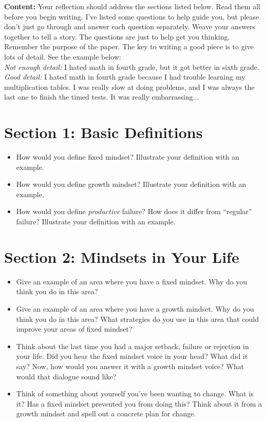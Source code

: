 \documentclass{article}
\begin{document}
\noindent\textbf{Content:} Your reflection should address the sections listed below.  Read them all before you begin writing. I've listed some questions to help guide you, but please don't just go through and answer each question separately.  Weave your answers together to tell a story. The questions are just to help get you thinking.  Remember the purpose of the paper.   The key to writing a good piece is to give lots of detail.  See the example below:\\

\noindent\textit{Not enough detail:} I hated math in fourth grade, but it got better in sixth grade.\\

\noindent\textit{Good detail:} I hated math in fourth grade because I had trouble learning my multiplication tables.  I was really slow at doing problems, and I was always the last one to finish the timed tests.  It was really embarrassing...

\section*{Section 1: Basic Definitions}
\begin{itemize}
\item How would you define fixed mindset? Illustrate your definition with an example.
\item How would you define growth mindset? Illustrate your definition with an example.
\item How would you define \textit{productive} failure? How does it differ from ``regular'' failure? Illustrate your definition with an example.
\end{itemize}

\section*{Section 2: Mindsets in Your Life}
\begin{itemize}
\item Give an example of an area where you have a fixed mindset. Why do you think you do in this area?
\item Give an example of an area where you have a growth mindset. Why do you think you do in this area? What strategies do you use in this area that could improve your areas of fixed mindset?
\item Think about the last time you had a major setback, failure or rejection in your life. Did you hear the fixed mindset voice in your head? What did it say? Now, how would you answer it with a growth mindset voice? What would that dialogue sound like?
\item Think of something about yourself you've been wanting to change. What is it? Has a fixed mindset prevented you from doing this? Think about it from a growth mindset and spell out a concrete plan for change.
\end{itemize}
\end{document}
